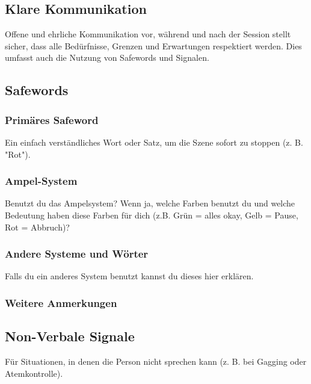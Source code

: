 \documentclass[a4paper,12pt]{article}
\begin{document}
 \subsection{Klare Kommunikation}
Offene und ehrliche Kommunikation vor, während und nach der Session stellt sicher, dass alle Bedürfnisse, Grenzen und Erwartungen respektiert werden. Dies umfasst auch die Nutzung von Safewords und Signalen.
\newpage

\subsection{Safewords}
\subsubsection{Primäres Safeword}
\noindent Ein einfach verständliches Wort oder Satz, um die Szene sofort zu stoppen (z. B. "Rot"). \newline
\noindent \TextField[name=SafewordWord,multiline=true,height=3em, width=37em]{}

\subsubsection{Ampel-System}
\noindent Benutzt du das Ampelsystem? Wenn ja, welche Farben benutzt du und welche Bedeutung haben diese Farben für dich (z.B. Grün = alles okay, Gelb = Pause, Rot = Abbruch)? \newline
\noindent \TextField[name=SafewordFarben,multiline=true,height=5em, width=37em]{}

\subsubsection{Andere Systeme und Wörter}
\noindent Falls du ein anderes System benutzt kannst du dieses hier erklären. \newline
\noindent \TextField[name=SafewordAnderesSystem,multiline=true,height=10em, width=37em]{}

\subsubsection{Weitere Anmerkungen}
\noindent \TextField[name=SafewordAnmerkungen,multiline=true,height=10em, width=37em]{}

\newpage
\subsection{Non-Verbale Signale}
Für Situationen, in denen die Person nicht sprechen kann (z. B. bei Gagging oder Atemkontrolle). 
\end{document}
